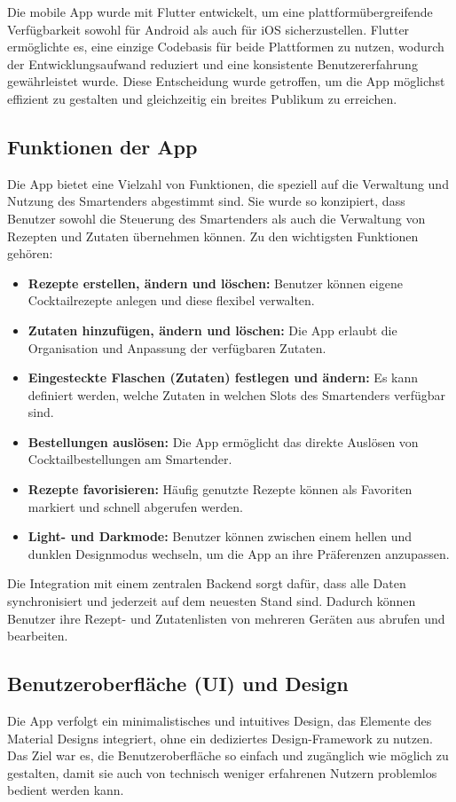 Die mobile App wurde mit Flutter entwickelt, um eine plattformübergreifende Verfügbarkeit sowohl für Android als auch für iOS sicherzustellen. Flutter ermöglichte es, eine einzige Codebasis für beide Plattformen zu nutzen, wodurch der Entwicklungsaufwand reduziert und eine konsistente Benutzererfahrung gewährleistet wurde. Diese Entscheidung wurde getroffen, um die App möglichst effizient zu gestalten und gleichzeitig ein breites Publikum zu erreichen.

\subsection{Funktionen der App}
Die App bietet eine Vielzahl von Funktionen, die speziell auf die Verwaltung und Nutzung des Smartenders abgestimmt sind. Sie wurde so konzipiert, dass Benutzer sowohl die Steuerung des Smartenders als auch die Verwaltung von Rezepten und Zutaten übernehmen können. Zu den wichtigsten Funktionen gehören:

\begin{itemize}
    \item \textbf{Rezepte erstellen, ändern und löschen:} Benutzer können eigene Cocktailrezepte anlegen und diese flexibel verwalten.
    \item \textbf{Zutaten hinzufügen, ändern und löschen:} Die App erlaubt die Organisation und Anpassung der verfügbaren Zutaten.
    \item \textbf{Eingesteckte Flaschen (Zutaten) festlegen und ändern:} Es kann definiert werden, welche Zutaten in welchen Slots des Smartenders verfügbar sind.
    \item \textbf{Bestellungen auslösen:} Die App ermöglicht das direkte Auslösen von Cocktailbestellungen am Smartender.
    \item \textbf{Rezepte favorisieren:} Häufig genutzte Rezepte können als Favoriten markiert und schnell abgerufen werden.
    \item \textbf{Light- und Darkmode:} Benutzer können zwischen einem hellen und dunklen Designmodus wechseln, um die App an ihre Präferenzen anzupassen.
\end{itemize}

Die Integration mit einem zentralen Backend sorgt dafür, dass alle Daten synchronisiert und jederzeit auf dem neuesten Stand sind. Dadurch können Benutzer ihre Rezept- und Zutatenlisten von mehreren Geräten aus abrufen und bearbeiten.

\subsection{Benutzeroberfläche (UI) und Design}
Die App verfolgt ein minimalistisches und intuitives Design, das Elemente des Material Designs integriert, ohne ein dediziertes Design-Framework zu nutzen. Das Ziel war es, die Benutzeroberfläche so einfach und zugänglich wie möglich zu gestalten, damit sie auch von technisch weniger erfahrenen Nutzern problemlos bedient werden kann.

